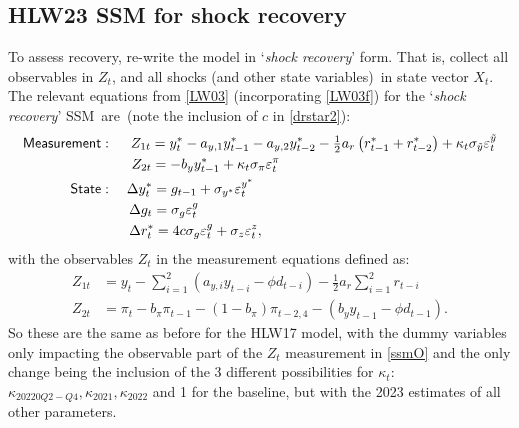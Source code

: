 \documentclass[a4paper,12pt]{article}
\newcommand{\bsq}{\begin{subequations}}\newcommand{\esq}{\end{subequations}}
\newcommand{\vsp}[1]{\vspace*{#1mm}}\newcommand{\hsp}[1]{\hspace*{#1mm}}  }
\begin{document}
\subsection{HLW23 SSM for shock recovery}

To assess recovery, re-write the model in `\emph{shock recovery}' form. That
is, collect all observables in $Z_{t}$, and all shocks (and other state
variables)\ in state vector $X_{t}$. The relevant equations from \ref{LW03}
(incorporating \ref{LW03f}) for the `\emph{shock recovery}' SSM\ are\ (note
the inclusion of $c$ in \ref{drstar2}):\bsq\label{ssm0}%
\begin{align}
\mathsf{Measurement}& :\;\quad Z_{1t}=y_{t}^{\ast }-a_{y,1}y_{t-1}^{\ast
}-a_{y,2}y_{t-2}^{\ast }-\tfrac{1}{2}a_{r}\left( r_{t-1}^{\ast
}+r_{t-2}^{\ast }\right) +\kappa _{t}\sigma _{\tilde{y}}\varepsilon _{t}^{%
\tilde{y}} \\
\phantom{\mathsf{Measurement}}& \,\,\;\;\phantom{:\quad}%
Z_{2t}=-b_{y}y_{t-1}^{\ast }+\kappa _{t}\sigma _{\pi }\varepsilon _{t}^{\pi }
\\
\mathsf{State}& :\quad \Delta y_{t}^{\ast }=g_{t-1}+\sigma _{y^{\ast
}}\varepsilon _{t}^{y^{\ast }} \\
\phantom{\mathsf{State}}& \;\,\;\phantom{:\quad}\Delta g_{t}=\sigma
_{g}\varepsilon _{t}^{g} \\
\phantom{\mathsf{State}}& \;\,\;\phantom{:\quad}\Delta r_{t}^{\ast
}=4c\sigma _{g}\varepsilon _{t}^{g}+\sigma _{z}\varepsilon _{t}^{z},
\label{drstar2}
\end{align}%
\esq with the observables $Z_{t}$ in the measurement equations defined as:%
\vsp{-3}\bsq\label{ssmO} 
\begin{align}
Z_{1t}& =y_{t}-\sum_{i=1}^{2}(a_{y,i}y_{t-i}-\phi d_{t-i})-\tfrac{1}{2}%
a_{r}\sum_{i=1}^{2}r_{t-i} \\
Z_{2t}& =\pi _{t}-b_{\pi }\pi _{t-1}-(1-b_{\pi })\pi
_{t-2,4}-(b_{y}y_{t-1}-\phi d_{t-1}).
\end{align}%
\esq So these are the same as before for the HLW17 model, with the dummy
variables only impacting the observable part of the $Z_{t}$ measurement in %
\ref{ssmO} and the only change being the inclusion of the 3 different
possibilities for $\kappa _{t}$: $\kappa _{20220Q2-Q4},\kappa _{2021},\kappa
_{2022}$ and 1 for the baseline, but with the 2023 estimates of all other
parameters.
\end{document}
